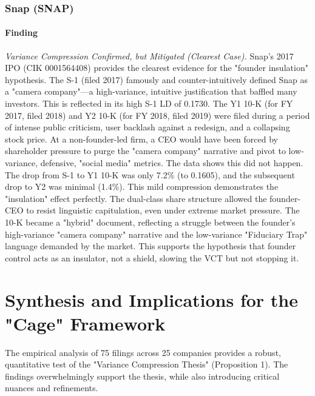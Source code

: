 \documentclass[12pt, letterpaper]{article}
\begin{document}
\subsubsection{Snap (SNAP)}
\paragraph{Finding} \textit{Variance Compression Confirmed, but Mitigated (Clearest Case).}
Snap's 2017 IPO (CIK 0001564408) provides the clearest evidence for the "founder insulation" hypothesis. The S-1 (filed 2017) \cite{key5} famously and counter-intuitively defined Snap as a "camera company"—a high-variance, intuitive justification that baffled many investors. This is reflected in its high S-1 LD of 0.1730. The Y1 10-K (for FY 2017, filed 2018) \cite{key58} and Y2 10-K (for FY 2018, filed 2019) \cite{key59} were filed during a period of intense public criticism, user backlash against a redesign, and a collapsing stock price. At a non-founder-led firm, a CEO would have been forced by shareholder pressure to purge the "camera company" narrative and pivot to low-variance, defensive, "social media" metrics. The data shows this did not happen. The drop from S-1 to Y1 10-K was only 7.2\% (to 0.1605), and the subsequent drop to Y2 was minimal (1.4\%). This mild compression demonstrates the "insulation" effect perfectly. The dual-class share structure allowed the founder-CEO to resist linguistic capitulation, even under extreme market pressure. The 10-K became a "hybrid" document, reflecting a struggle between the founder's high-variance "camera company" narrative and the low-variance "Fiduciary Trap" language demanded by the market. This supports the hypothesis that founder control acts as an insulator, not a shield, slowing the VCT but not stopping it.

\section{Synthesis and Implications for the "Cage" Framework}
The empirical analysis of 75 filings across 25 companies provides a robust, quantitative test of the "Variance Compression Thesis" (Proposition 1). The findings overwhelmingly support the thesis, while also introducing critical nuances and refinements.
\end{document}
